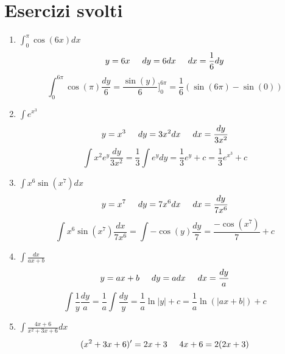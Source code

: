 \chapter*{Esercizi svolti}
\begin{exercise}\phantom{}
\begin{enumerate}
    \item $\int^\pi_0 \cos(6x)dx$\begin{equation*}y=6x\hspace{0.5cm}dy=6dx\hspace{0.5cm}dx=\frac{1}{6}dy\end{equation*}\begin{equation*}\int^{6\pi}_0\cos(\pi)\frac{dy}{6}=\frac{\sin(y)}{6}]^{6\pi}_0=\frac{1}{6}(\sin(6\pi)-\sin(0))\end{equation*}
    \item $\int e^{x^3}$\begin{equation*}y=x^3\hspace{.5cm}dy=3x^2dx\hspace{.5cm}dx=\frac{dy}{3x^2}\end{equation*}
    \begin{equation*}\int x^2e^y\frac{dy}{3x^2}=\frac{1}{3}\int e^ydy=\frac{1}{3}e^y+c=\frac{1}{3}e^{x^3}+c\end{equation*}
    \item $\int x^6\sin(x^7)dx$\begin{equation*}y=x^7\hspace{.5cm}dy=7x^6dx\hspace{.5cm}dx=\frac{dy}{7x^6}\end{equation*}
    \begin{equation*}\int x^6\sin(x^7)\frac{dx}{7x^6}=\int -\cos(y)\frac{dy}{7}=\frac{-\cos(x^7)}{7}+c\end{equation*}
    \item $\int\frac{dx}{ax+b}$\begin{equation*}y=ax+b\hspace{.5cm}dy=adx\hspace{.5cm}dx=\frac{dy}{a}\end{equation*}
    \begin{equation*}\int\frac{1}{y}\frac{dy}{a}=\frac{1}{a}\int\frac{dy}{y}=\frac{1}{a}\ln|y|+c=\frac{1}{a}\ln(|ax+b|)+c\end{equation*}
    \item $\int\frac{4x+6}{x^2+3x+6}dx$\begin{equation*}(x^2+3x+6)'=2x+3\hspace{.5cm}4x+6=2(2x+3)\end{equation*}

\end{enumerate}
\end{exercise}
